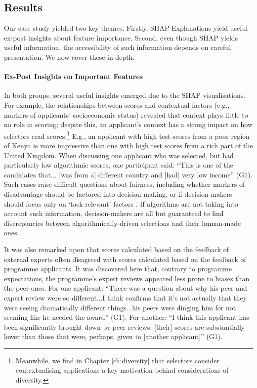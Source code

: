 \subsection{Results}\label{sec:cs_results}
Our case study yielded two key themes. Firstly, SHAP Explanations yield useful ex-post insights about feature importance. Second, even though SHAP yields useful information, the accessibility of such information depends on careful presentation. We now cover these in depth.

\paragraph{Ex-Post Insights on Important Features}
In both groups, several useful insights emerged due to the SHAP visualisations. For example, the relationships between scores and contextual factors (e.g., markers of applicants' socioeconomic status) revealed that context plays little to no role in scoring; despite this, an applicant's context has a strong impact on how selectors read scores.\footnote{Meanwhile, we find in Chapter \ref{ch:diversity} that selectors consider contextualising applications a key motivation behind considerations of diversity.} E.g., an applicant with high test scores from a poor region of Kenya is more impressive than one with high test scores from a rich part of the United Kingdom. When discussing one applicant who was selected, but had particularly low algorithmic scores, one participant said: ``This is one of the candidates that... [was from a] different country and [had] very low income'' (G1). Such cases raise difficult questions about fairness, including whether markers of disadvantage should be factored into decision-making, or if decision-makers should focus only on `task-relevant' factors \cite{dwork_fairness_2012}. If algorithms are not taking into account such information, decision-makers are all but guaranteed to find discrepancies between algorithmically-driven selections and their human-made ones.

It was also remarked upon that scores calculated based on the feedback of external experts often disagreed with scores calculated based on the feedback of programme applicants. It was discovered here that, contrary to programme expectations, the programme's expert reviews appeared less prone to biases than the peer ones. For one applicant: ``There was a question about why his peer and expert review were so different...I think confirms that it's not actually that they were seeing dramatically different things...his peers were dinging him for not seeming like he needed the award'' (G1). For another: ``I think this applicant has been significantly brought down by peer reviews; [their] scores are substantially lower than those that were, perhaps, given to [another applicant]'' (G1).

